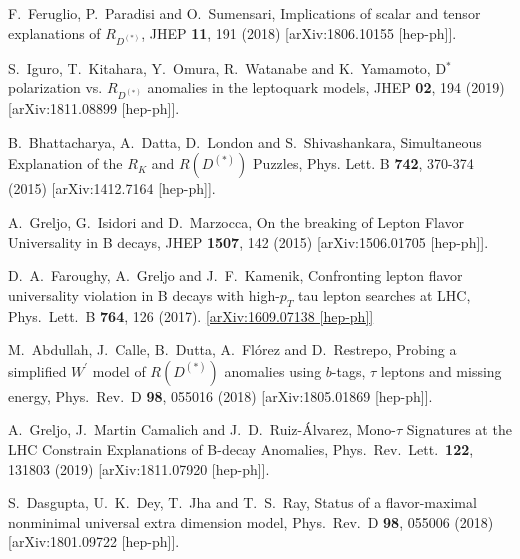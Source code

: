 \documentclass[reprint,showpacs,aps,prd,nofootinbib,superscriptaddress,longbibliography]{revtex4-1}
\begin{document}
\begin{thebibliography}{99}
F.~Feruglio, P.~Paradisi and O.~Sumensari, Implications of scalar and tensor explanations of $R_{D^{(\ast)}}$,
JHEP \textbf{11}, 191 (2018)
[arXiv:1806.10155 [hep-ph]].

S.~Iguro, T.~Kitahara, Y.~Omura, R.~Watanabe and K.~Yamamoto, D$^{*}$ polarization vs. $ {R}_{D^{\left(\ast \right)}} $ anomalies in the leptoquark models, JHEP \textbf{02}, 194 (2019)
[arXiv:1811.08899 [hep-ph]].



B.~Bhattacharya, A.~Datta, D.~London and S.~Shivashankara, Simultaneous Explanation of the $R_K$ and $R(D^{(*)})$ Puzzles, Phys. Lett. B \textbf{742}, 370-374 (2015)
[arXiv:1412.7164 [hep-ph]].

A.~Greljo, G.~Isidori and D.~Marzocca, On the breaking of Lepton Flavor Universality in B decays,  JHEP {\bf 1507}, 142 (2015)   [arXiv:1506.01705 [hep-ph]].

D.~A.~Faroughy, A.~Greljo and J.~F.~Kamenik, Confronting lepton flavor universality violation in B decays with high-$p_T$ tau lepton searches at LHC, Phys.\ Lett.\ B {\bf 764}, 126 (2017). \href{http://arxiv.org/abs/1609.07138}{[arXiv:1609.07138 [hep-ph]]} 

M.~Abdullah, J.~Calle, B.~Dutta, A.~Fl\'{o}rez and D.~Restrepo, Probing a simplified $W^{\prime}$ model of $R(D^{(\ast)})$ anomalies using $b$-tags, $\tau$ leptons and missing energy, Phys.\ Rev.\ D {\bf 98}, 055016 (2018) [arXiv:1805.01869 [hep-ph]].

 A.~Greljo, J.~Martin Camalich and J.~D.~Ruiz-\'{A}lvarez, Mono-$\tau$ Signatures at the LHC Constrain Explanations of B-decay Anomalies, Phys.\ Rev.\ Lett.\  {\bf 122}, 131803 (2019) [arXiv:1811.07920 [hep-ph]].

  S.~Dasgupta, U.~K.~Dey, T.~Jha and T.~S.~Ray, Status of a flavor-maximal nonminimal universal extra dimension model, Phys.\ Rev.\ D {\bf 98}, 055006 (2018)   [arXiv:1801.09722 [hep-ph]].


\end{thebibliography}
\end{document}
